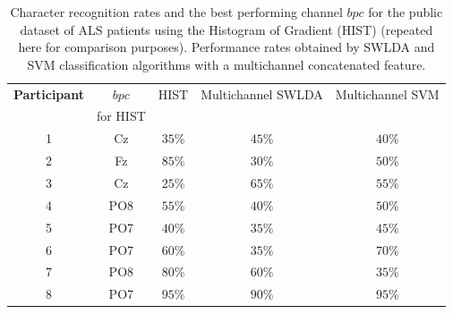 \documentclass[utf8]{frontiersSCNS} %
\begin{document}
\begin{table}[htb]
\caption{Character recognition rates and the best performing channel $bpc$ for the public dataset of ALS patients using the Histogram of Gradient (HIST) (repeated here for comparison purposes). Performance rates obtained by SWLDA and SVM classification algorithms with a multichannel concatenated feature.}
\centering
\begin{tabular}{c|cc|c|c}
\toprule
\textbf{Participant}	&  $bpc$	&  HIST & Multichannel SWLDA & Multichannel SVM \\
                                    &  for HIST        &           &                                       &   \\
\midrule
1     &     Cz   &   $35\%$  & $45\%$  & $40\%$\\
2     &     Fz   &   $85\%$  & $30\%$   & $50\%$   \\
3     &     Cz   &   $25\%$  & $65\%$ & $55\%$   \\
4     &     PO8 &   $55\%$ & $40\%$  & $50\%$   \\
5     &     PO7 &   $40\%$ & $35\%$  & $45\%$   \\
6     &     PO7 &   $60\%$ &  $35\%$  & $70\%$   \\
7     &     PO8 &   $80\%$ & $60\%$   & $35\%$   \\
8     &     PO7 &   $95\%$  & $90\%$   & $95\%$  \\

\end{tabular}
\label{tab:resultsalsswlda}
\end{table}
\end{document}
